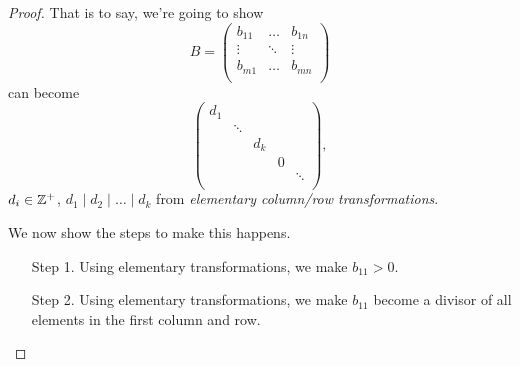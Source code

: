 \begin{proof}
	That is to say, we're going to show
	\[
		B = \begin{pmatrix}
			b_{11} & \ldots & b_{1n} \\
			\vdots & \ddots & \vdots \\
			b_{m1} & \ldots & b_{mn} \\
		\end{pmatrix}
	\]
	can become
	\[
		\begin{pmatrix}
			d_1 &        &       &   &        \\
			    & \ddots &       &   &        \\
			    &        & d_{k} &   &        \\
			    &        &       & 0 &        \\
			    &        &       &   & \ddots \\
		\end{pmatrix},
	\]
	\(d_{i} \in \mathbb{\MakeUppercase{z}} ^+\), \(d_1\mid d_2 \mid \ldots \mid d_k \) from \emph{elementary column/row transformations}.

	We now show the steps to make this happens.
	\begin{enumerate}
		\item[Step 1.] Using elementary transformations, we make \(b_{11} >0 \).
		\item[Step 2.] Using elementary transformations, we make \(b_{11}\) become a divisor of all elements in the first column and row.


\end{enumerate}
\end{proof}
